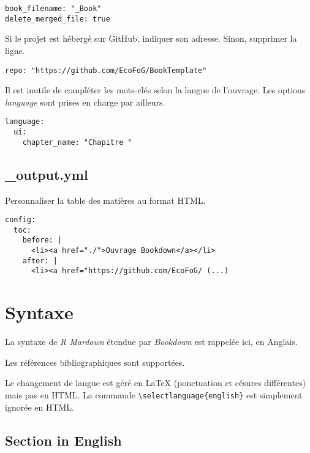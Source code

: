 \documentclass[
  11pt,
  french,
  a4paper,
  extrafontsizes,onecolumn,openright
  ]{memoir}
\begin{document}
\begin{verbatim}
book_filename: "_Book"
delete_merged_file: true
\end{verbatim}

Si le projet est hébergé sur GitHub, indiquer son adresse.
Sinon, supprimer la ligne.

\begin{verbatim}
repo: "https://github.com/EcoFoG/BookTemplate"
\end{verbatim}

Il est inutile de compléter les mots-clés selon la langue de l'ouvrage.
Les options \emph{language} sont prises en charge par ailleurs.

\begin{verbatim}
language:
  ui:
    chapter_name: "Chapitre "
\end{verbatim}

\hypertarget{output.yml}{%
\section{\_output.yml}\label{output.yml}}

Personnaliser la table des matières au format HTML.

\begin{verbatim}
config:
  toc:
    before: |
      <li><a href="./">Ouvrage Bookdown</a></li>
    after: |
      <li><a href="https://github.com/EcoFoG/ (...)
\end{verbatim}

\hypertarget{syntaxe}{%
\chapter{Syntaxe}\label{syntaxe}}

La syntaxe de \emph{R Mardown} étendue par \emph{Bookdown} est rappelée ici, en Anglais.

Les références bibliographiques \autocite{xie2015} sont supportées.

Le changement de langue est géré en LaTeX (ponctuation et césures différentes) mais pas en HTML.
La commande \texttt{\textbackslash{}selectlanguage\{english\}} est simplement ignorée en HTML.


\hypertarget{section-in-english}{%
\section{Section in English}\label{section-in-english}}
\end{document}
